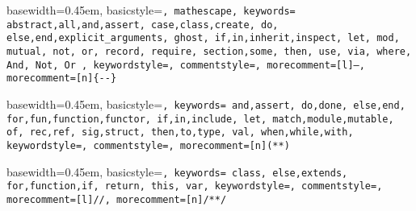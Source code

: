 { basewidth=0.45em,
  basicstyle=\small\tt,  %
  mathescape,
  keywords={
    abstract,all,and,assert,
    case,class,create,
    do,
    else,end,explicit_arguments,
    ghost,
    if,in,inherit,inspect,
    let,
    mod,
    mutual,
    not,
    or,
    record, require,
    section,some,
    then,
    use,
    via,
    where,
    And,
    Not,
    Or
  },
  keywordstyle=\color{blue},
  commentstyle=\color{brown},
  morecomment=[l]{--},
  morecomment=[n]{\{-}{-\}}
}

 {\lstset{language=alba}} {}







{ basewidth=0.45em,
  basicstyle=\tt\small,
  keywords={
    and,assert,
    do,done,
    else,end,
    for,fun,function,functor,
    if,in,include,
    let,
    match,module,mutable,
    of,
    rec,ref,
    sig,struct,
    then,to,type,
    val,
    when,while,with},
  keywordstyle=\color{blue},
  commentstyle=\color{brown},
  morecomment=[n]{(*}{*)}
}

 {\lstset{language=ocaml}} {}





{ basewidth=0.45em,
  basicstyle=\small\tt,
  keywords={
    class,
    else,extends,
    for,function,if,
    return,
    this,
    var},
  keywordstyle=\color{blue},
  commentstyle=\color{brown},
  morecomment=[l]{//},
  morecomment=[n]{/*}{*/}
}

 {\lstset{language=js}} {}




\newcommand{\code}[1]{{\tt\small #1}}

\def\ignore#1{}

\def\vec#1{\mathbf{#1}}
\def\meta#1{{}^?\!#1}

\def\Abold{\mathbf{A}}
\def\abold{\mathbf{a}}
\def\Bbold{\mathbf{B}}
\def\bbold{\mathbf{b}}
\def\Cbold{\mathbf{C}}
\def\Dbold{\mathbf{D}}
\def\fbold{\mathbf{f}}
\def\Pbold{\mathbf{P}}
\def\pbold{\mathbf{p}}
\def\qbold{\mathbf{q}}
\def\Tbold{\mathbf{T}}
\def\tbold{\mathbf{t}}
\def\xbold{\mathbf{x}}
\def\ybold{\mathbf{y}}
\def\zbold{\mathbf{z}}


\def\Abstract{{\cal{A}}}
\def\Any{{\cal{U}}}
\def\Boolean  {{\mathbb{B}}}
\def\Decision {{\mathbb{D}}}
\def\List   {{\mathbb{L}}}
\def\Natural{{\mathbb{N}}}
\def\Prop{{\cal{P}}}

